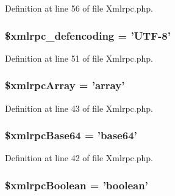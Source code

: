 Definition at line 56 of file Xmlrpc.\-php.

\hypertarget{class_c_i___xmlrpc_a7a31af447cebbb81b1f3c5581cd90d5a}{
\subsubsection[{\$xmlrpc\-\_\-defencoding}]{\setlength{\rightskip}{0pt plus 5cm}\$xmlrpc\-\_\-defencoding = 'U\-T\-F-\/8'}}\label{class_c_i___xmlrpc_a7a31af447cebbb81b1f3c5581cd90d5a}


Definition at line 51 of file Xmlrpc.\-php.

\hypertarget{class_c_i___xmlrpc_aedecd71f2438e9a44a8f5a1dc73f4c7a}{
\subsubsection[{\$xmlrpc\-Array}]{\setlength{\rightskip}{0pt plus 5cm}\$xmlrpc\-Array = 'array'}}\label{class_c_i___xmlrpc_aedecd71f2438e9a44a8f5a1dc73f4c7a}


Definition at line 43 of file Xmlrpc.\-php.

\hypertarget{class_c_i___xmlrpc_a95dc3164d1c3e1fdaf7185095fb376ae}{
\subsubsection[{\$xmlrpc\-Base64}]{\setlength{\rightskip}{0pt plus 5cm}\$xmlrpc\-Base64 = 'base64'}}\label{class_c_i___xmlrpc_a95dc3164d1c3e1fdaf7185095fb376ae}


Definition at line 42 of file Xmlrpc.\-php.

\hypertarget{class_c_i___xmlrpc_abb241cb9cac2595c7ef28106808ec438}{
\subsubsection[{\$xmlrpc\-Boolean}]{\setlength{\rightskip}{0pt plus 5cm}\$xmlrpc\-Boolean = 'boolean'}}\label{class_c_i___xmlrpc_abb241cb9cac2595c7ef28106808ec438}


